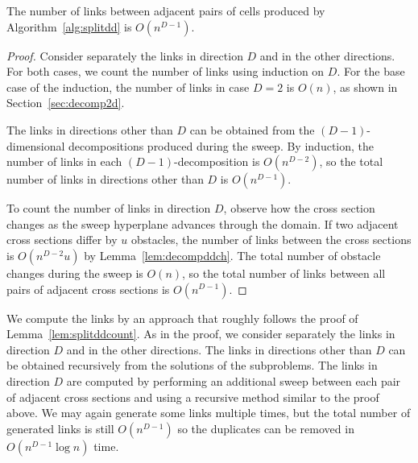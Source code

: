 \documentclass[english,gradu]{tktltiki2018}
\begin{document}
\begin{lem}\label{lem:splitddcount}The number of links between adjacent pairs of cells produced by Algorithm~\ref{alg:splitdd} is $O(n^{D-1})$.\end{lem}
\begin{proof}
Consider separately the links in direction $D$ and in the other directions.
For both cases, we count the number of links using induction on $D$.
For the base case of the induction, the number of links in case $D=2$ is $O(n)$, as shown in Section~\ref{sec:decomp2d}.

The links in directions other than $D$ can be obtained from the $(D-1)$-dimensional decompositions produced during the sweep.
By induction, the number of links in each $(D-1)$-decomposition is $O(n^{D-2})$, so the total number of links in directions other than $D$ is $O(n^{D-1})$.

To count the number of links in direction $D$, observe how the cross section changes as the sweep hyperplane advances through the domain.
If two adjacent cross sections differ by $u$ obstacles, the number of links between the cross sections is $O(n^{D-2}u)$ by Lemma~\ref{lem:decompddch}.
The total number of obstacle changes during the sweep is $O(n)$, so the total number of links between all pairs of adjacent cross sections is $O(n^{D-1})$.
\end{proof}

We compute the links by an approach that roughly follows the proof of Lemma~\ref{lem:splitddcount}.
As in the proof, we consider separately the links in direction $D$ and in the other directions.
The links in directions other than $D$ can be obtained recursively from the solutions of the subproblems.
The links in direction $D$ are computed by performing an additional sweep between each pair of adjacent cross sections and using a recursive method similar to the proof above.
We may again generate some links multiple times, but the total number of generated links is still $O(n^{D-1})$ so the duplicates can be removed in $O(n^{D-1}\log n)$ time.
\end{document}

